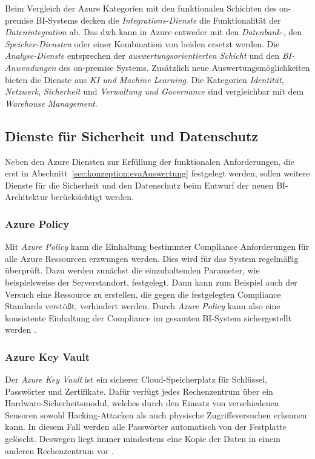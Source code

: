 Beim Vergleich der Azure Kategorien mit den funktionalen Schichten des on-premise BI-Systems decken die \textit{Integrations-Dienste} die Funktionalität der \textit{Datenintegration} ab. Das \ac{dwh} kann in Azure entweder mit den \textit{Datenbank-}, den \textit{Speicher-Diensten} oder einer Kombination von beiden ersetzt werden. Die \textit{Analyse-Dienste} entsprechen der \textit{auswertungsorientierten Schicht} und den \textit{BI-Anwendungen} des on-premise Systems. Zusätzlich neue Auswertungsmöglichkeiten bieten die Dienste aus \textit{KI und Machine Learning}. Die Kategorien \textit{Identität}, \textit{Netzwerk}, \textit{Sicherheit} und \textit{Verwaltung und Governance} sind vergleichbar mit dem \textit{Warehouse Management}.

\subsection{Dienste für Sicherheit und Datenschutz} \label{subsec:grundlagen:azure:sicherheitUndDatenschutz}
Neben den Azure Diensten zur Erfüllung der funktionalen Anforderungen, die erst in Abschnitt~\ref{sec:konzeption:evaAuswertung} festgelegt werden, sollen weitere Dienste für die Sicherheit und den Datenschutz beim Entwurf der neuen BI-Architektur berücksichtigt werden.

\subsubsection{Azure Policy} \label{subsec:grundlagen:azure:sicherheitUndDatenschutz:ap}
Mit \textit{Azure Policy} kann die Einhaltung bestimmter Compliance Anforderungen für alle Azure Ressourcen erzwungen werden. Dies wird für das System regelmäßig überprüft. Dazu werden zunächst die einzuhaltenden Parameter, wie beispielsweise der Serverstandort, festgelegt. Dann kann zum Beispiel auch der Versuch eine Ressource zu erstellen, die gegen die festgelegten Compliance Standards verstößt, verhindert werden. Durch \textit{Azure Policy} kann also eine konsistente Einhaltung der Compliance im gesamten BI-System sichergestellt werden \cite{stefanovic_azure_2021}.

\subsubsection{Azure Key Vault} \label{subsec:grundlagen:azure:sicherheitUndDatenschutz:keyVault}
Der \textit{Azure Key Vault} ist ein sicherer Cloud-Speicherplatz für Schlüssel, Passwörter und Zertifikate. Dafür verfügt jedes Rechenzentrum über ein Hardware-Sicherheitsmodul, welches durch den Einsatz von verschiedenen Sensoren sowohl Hacking-Attacken als auch physische Zugriffsversuchen erkennen kann. In diesem Fall werden alle Passwörter automatisch von der Festplatte gelöscht. Deswegen liegt immer mindestens eine Kopie der Daten in einem anderen Rechenzentrum vor \cite{haunts_key_2019}.

